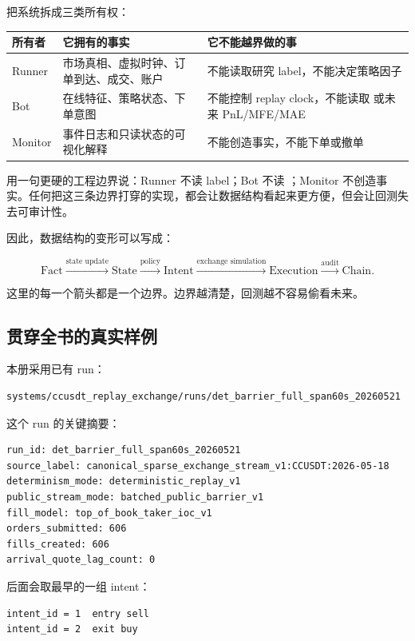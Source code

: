 \documentclass[11pt,a4paper]{ctexart}
\newcommand{\code}[1]{\texttt{\detokenize{#1}}}
\begin{document}
把系统拆成三类所有权：

\begin{longtable}{p{}p{}p{}}
\toprule
所有者 & 它拥有的事实 & 它不能越界做的事 \\
\midrule
Runner & 市场真相、虚拟时钟、订单到达、成交、账户 & 不能读取研究 label，不能决定策略因子 \\
Bot & 在线特征、策略状态、下单意图 & 不能控制 replay clock，不能读取 \code{date/} 或未来 PnL/MFE/MAE \\
Monitor & 事件日志和只读状态的可视化解释 & 不能创造事实，不能下单或撤单 \\
\bottomrule
\end{longtable}

用一句更硬的工程边界说：Runner 不读 label；Bot 不读 \code{date/}；Monitor 不创造事实。任何把这三条边界打穿的实现，都会让数据结构看起来更方便，但会让回测失去可审计性。

因此，数据结构的变形可以写成：

\[
\text{Fact}
\xrightarrow{\text{state update}}
\text{State}
\xrightarrow{\text{policy}}
\text{Intent}
\xrightarrow{\text{exchange simulation}}
\text{Execution}
\xrightarrow{\text{audit}}
\text{Chain}.
\]

这里的每一个箭头都是一个边界。边界越清楚，回测越不容易偷看未来。

\subsection{贯穿全书的真实样例}

本册采用已有 run：

\begin{lstlisting}
systems/ccusdt_replay_exchange/runs/det_barrier_full_span60s_20260521
\end{lstlisting}

这个 run 的关键摘要：

\begin{lstlisting}
run_id: det_barrier_full_span60s_20260521
source_label: canonical_sparse_exchange_stream_v1:CCUSDT:2026-05-18
determinism_mode: deterministic_replay_v1
public_stream_mode: batched_public_barrier_v1
fill_model: top_of_book_taker_ioc_v1
orders_submitted: 606
fills_created: 606
arrival_quote_lag_count: 0
\end{lstlisting}

后面会取最早的一组 intent：

\begin{lstlisting}
intent_id = 1  entry sell
intent_id = 2  exit buy
\end{lstlisting}
\end{document}

